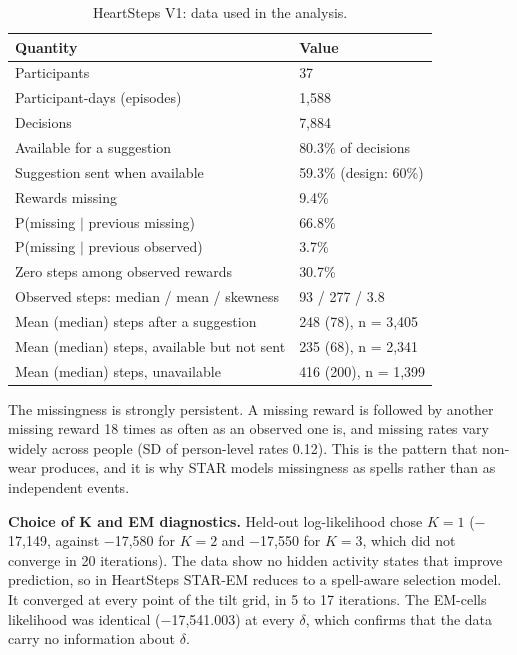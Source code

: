 \documentclass[12pt]{article}
\begin{document}
\begin{table}[!htbp]\centering\small
\caption{HeartSteps V1: data used in the analysis.}
\begin{tabular}{p{}l}
\toprule
\textbf{Quantity} & \textbf{Value} \\
\midrule
Participants & 37 \\
Participant-days (episodes) & 1,588 \\
Decisions & 7,884 \\
Available for a suggestion & 80.3\% of decisions \\
Suggestion sent when available & 59.3\% (design: 60\%) \\
Rewards missing & 9.4\% \\
P(missing $|$ previous missing) & 66.8\% \\
P(missing $|$ previous observed) & 3.7\% \\
Zero steps among observed rewards & 30.7\% \\
Observed steps: median / mean / skewness & 93 / 277 / 3.8 \\
Mean (median) steps after a suggestion & 248 (78), n = 3,405 \\
Mean (median) steps, available but not sent & 235 (68), n = 2,341 \\
Mean (median) steps, unavailable & 416 (200), n = 1,399 \\
\bottomrule
\end{tabular}
\end{table}

The missingness is strongly persistent. A missing reward is followed by another missing reward 18 times as often as an observed one is, and missing rates vary widely across people (SD of person-level rates 0.12). This is the pattern that non-wear produces, and it is why STAR models missingness as spells rather than as independent events.

\textbf{Choice of K and EM diagnostics.} Held-out log-likelihood chose $K=1$ ($-$17,149, against $-$17,580 for $K=2$ and $-$17,550 for $K=3$, which did not converge in 20 iterations). The data show no hidden activity states that improve prediction, so in HeartSteps STAR-EM reduces to a spell-aware selection model. It converged at every point of the tilt grid, in 5 to 17 iterations. The EM-cells likelihood was identical ($-$17,541.003) at every $\delta$, which confirms that the data carry no information about $\delta$.
\end{document}
